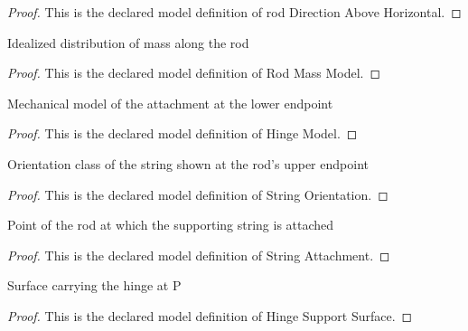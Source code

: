 \begin{proof}
  This is the declared model definition of rod Direction Above Horizontal.
\end{proof}
\begin{definition}
  \label{def:physics:phyx-mini-0953:phyxminiproblems-problemphyxmini0953-rodmassmodel}
  Idealized distribution of mass along the rod
\end{definition}
\begin{proof}
  This is the declared model definition of Rod Mass Model.
\end{proof}
\begin{definition}
  \label{def:physics:phyx-mini-0953:phyxminiproblems-problemphyxmini0953-hingemodel}
  Mechanical model of the attachment at the lower endpoint
\end{definition}
\begin{proof}
  This is the declared model definition of Hinge Model.
\end{proof}
\begin{definition}
  \label{def:physics:phyx-mini-0953:phyxminiproblems-problemphyxmini0953-stringorientation}
  Orientation class of the string shown at the rod's upper endpoint
\end{definition}
\begin{proof}
  This is the declared model definition of String Orientation.
\end{proof}
\begin{definition}
  \label{def:physics:phyx-mini-0953:phyxminiproblems-problemphyxmini0953-stringattachment}
  Point of the rod at which the supporting string is attached
\end{definition}
\begin{proof}
  This is the declared model definition of String Attachment.
\end{proof}
\begin{definition}
  \label{def:physics:phyx-mini-0953:phyxminiproblems-problemphyxmini0953-hingesupportsurface}
  Surface carrying the hinge at P
\end{definition}
\begin{proof}
  This is the declared model definition of Hinge Support Surface.
\end{proof}
